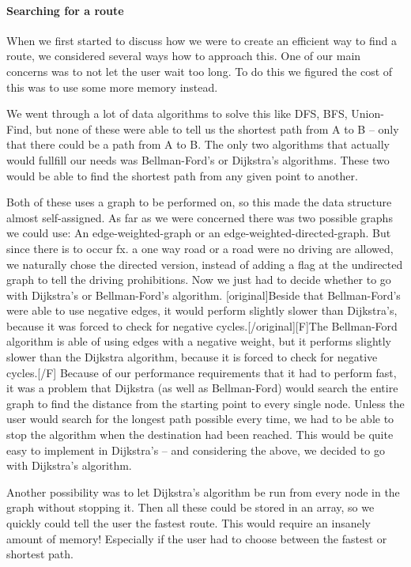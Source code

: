 \documentclass[a4paper,10pt,titlepage]{article}
\begin{document}
\paragraph{Searching for a route}
When we first started to discuss how we were to create an efficient way to find a route, we considered several ways how to approach this. One of our main concerns was to not let the user wait too long. To do this we figured the cost of this was to use some more memory instead. 

We went through a lot of data algorithms to solve this like DFS, BFS, Union-Find, but none of these were able to tell us the shortest path from A to B – only that there could be a path from A to B. The only two algorithms that actually would fullfill our needs was Bellman-Ford’s or Dijkstra’s algorithms. These two would be able to find the shortest path from any given point to another. 

Both of these uses a graph to be performed on, so this made the data structure almost self-assigned. As far as we were concerned there was two possible graphs we could use: An edge-weighted-graph or an edge-weighted-directed-graph. But since there is to occur fx. a one way road or a road were no driving are allowed, we naturally chose the directed version, instead of adding a flag at the undirected graph to tell the driving prohibitions. Now we just had to decide whether to go with Dijkstra’s or Bellman-Ford’s algorithm.
[original]Beside that Bellman-Ford’s were able to use negative edges, it would perform slightly slower than Dijkstra’s, because it was forced to check for negative cycles.[/original][F]The Bellman-Ford algorithm is able of using edges with a negative weight, but it performs slightly slower than the  Dijkstra algorithm, because it is forced to check for negative cycles.[/F] Because of our performance requirements that it had to perform fast, it was a problem that Dijkstra (as well as Bellman-Ford) would search the entire graph to find the distance from the starting point to every single node. Unless the user would search for the longest path possible every time, we had to be able to stop the algorithm when the destination had been reached. This would be quite easy to implement in Dijkstra’s – and considering the above, we decided to go with Dijkstra’s algorithm.

Another possibility was to let Dijkstra’s algorithm be run from every node in the graph without stopping it. Then all these could be stored in an array, so we quickly could tell the user the fastest route. This would require an insanely amount of memory! Especially if the user had to choose between the fastest or shortest path.
\end{document}
